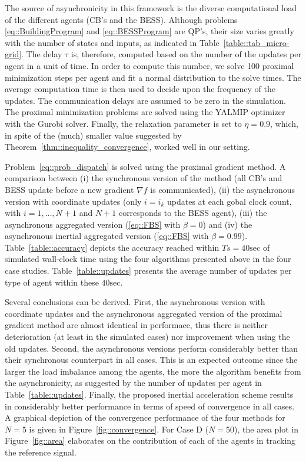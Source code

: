\documentclass[envcountsect]{svjour3}
\begin{document}
The source of asynchronicity in this framework is the diverse computational load of the different agents (CB's and the BESS). Although problems \eqref{eq::BuildingProgram} and \eqref{eq::BESSProgram} are QP's, their size varies greatly with the number of states and inputs, as indicated in Table~\ref{table::tab_micro-grid}. The delay $\tau$ is, therefore, computed based on the number of the updates per agent in a unit of time. In order to compute this number, we solve 100 proximal minimization steps per agent and fit a normal distribution to the solve times. The average computation time is then used to decide upon the frequency of the updates. The communication delays are assumed to be zero in the simulation. The proximal minimization problems are solved using the YALMIP optimizer~\cite{YALMIP} with the Gurobi solver. Finally, the relaxation parameter is set to $\eta=0.9$, which, in spite of the (much) smaller value suggested by Theorem~\ref{thm::inequality_convergence}, worked well in our setting.

Problem~\eqref{eq::prob_dispatch} is solved using the proximal gradient method. A comparison between (i) the synchronous version of the method (all CB's and BESS update before a new gradient $\nabla f$ is communicated), (ii) the asynchronous version with coordinate updates (only $i=i_k$ updates at each gobal clock count, with $i=1,\ldots,N+1$ and $N+1$ corresponds to the BESS agent), (iii) the asynchronous aggregated version (\eqref{eq::FBS} with $\beta=0$) and (iv) the asynchronous inertial aggregated version (\eqref{eq::FBS} with $\beta=0.99$). Table~\ref{table::accuracy} depicts the accuracy reached within $Ts=40\mathrm{sec}$ of simulated wall-clock time using the four algorithms presented above in the four case studies. Table~\ref{table::updates} presents the average number of updates per type of agent within these $40\mathrm{sec}$.

Several conclusions can be derived. First, the asynchronous version with coordinate updates and the asynchronous aggregated version of the proximal gradient method are almost identical in performace, thus there is neither deterioration (at least in the simulated cases) nor improvement when using the old updates. Second, the asynchronous versions perform considerably better than their synchronous counterpart in all cases. This is an expected outcome since the larger the load imbalance among the agents, the more the algorithm benefits from the asynchronicity, as suggested by the number of updates per agent in Table~\ref{table::updates}. Finally, the proposed inertial acceleration scheme results in considerably better performance in terms of speed of convergence in all cases. A graphical depiction of the convergence performance of the four methods for $N=5$ is given in Figure~\ref{fig::convergence}. For Case D ($N=50$), the area plot in Figure~\ref{fig::area} elaborates on the contribution of each of the agents in tracking the reference signal.
\end{document}
